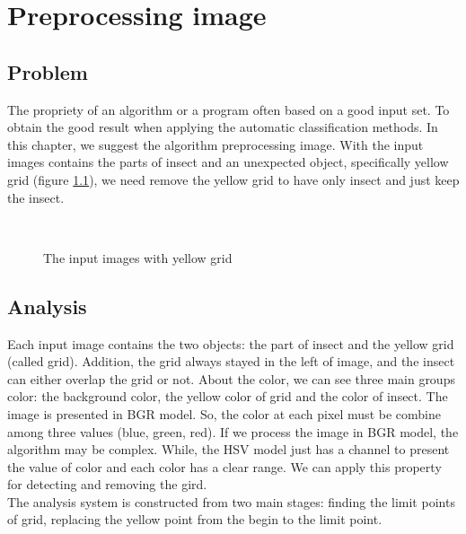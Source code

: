 \chapter{Preprocessing image}
\section{Problem}
The propriety of an algorithm or a program often based on a good input set. To obtain the good result when applying the automatic classification methods. In this chapter, we suggest the algorithm preprocessing image. With the input images contains the parts of insect and an unexpected object, specifically yellow grid (figure \ref{fig:figure_31}), we need remove the yellow grid to have only insect and just keep the insect.
\begin{figure}[h!]
\centering
{}~~
\caption{The input images with yellow grid}
\label{fig:figure_31}
\end{figure}
\section{Analysis}
Each input image contains the two objects: the part of insect and the yellow grid (called grid). Addition, the grid always stayed in the left of image, and the insect can either overlap the grid or not. About the color, we can see three main groups color: the background color, the yellow color of grid and the color of insect. The image is presented in BGR model. So, the color at each pixel must be combine among three values (blue, green, red). If we process the image in BGR model, the algorithm may be complex. While, the HSV model just has a channel to present the value of color and each color has a clear range. We can apply this property for detecting and removing the gird.\\
The analysis system is constructed from two main stages: finding the limit points of grid, replacing the yellow point from the begin to the limit point.
